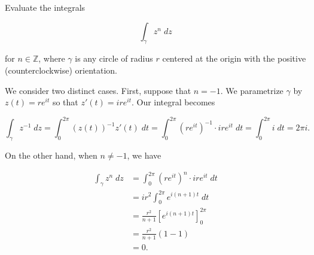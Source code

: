 Evaluate the integrals

$$
\int_{\gamma} z^n \; dz
$$

for $n \in \mathbb{Z}$, where $\gamma$ is any circle of radius $r$ centered at the origin with the positive 
(counterclockwise) orientation.

\begin{solution}
    We consider two distinct cases. First, suppose that $n = -1$. We parametrize $\gamma$ by $z(t) = r e^{it}$ so that
    $z'(t) = i r e^{it}$. Our integral becomes

    $$
        \int_{\gamma} z^{-1} \; dz = \int_{0}^{2 \pi} (z(t))^{-1} z'(t) \; dt 
                                   = \int_{0}^{2 \pi} (r e^{i t})^{-1} \cdot i r e^{i t} \; dt 
                                   = \int_{0}^{2 \pi} i \; dt = 2 \pi i.
    $$

    On the other hand, when $n \neq -1$, we have

    \begin{align*}
        \int_{\gamma} z^n \; dz &= \int_{0}^{2 \pi} (r e^{i t})^{n} \cdot i r e^{it} \; dt \\
                                &= i r^2 \int_{0}^{2 \pi} e^{i (n + 1) t} \; dt \\
                                &= \frac{r^2}{n + 1} \left[ e^{i (n + 1) t} \right]_{0}^{2 \pi} \\
                                &= \frac{r^2}{n + 1} (1 - 1) \\
                                &= 0.
    \end{align*}
    \ \\
\end{solution}